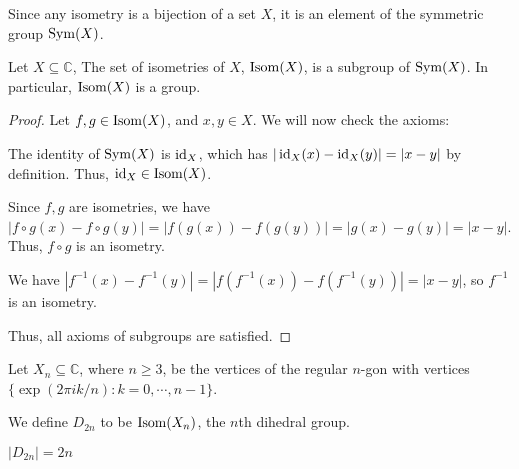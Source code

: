 \documentclass[12pt]{article}
\begin{document}
Since any isometry is a bijection of a set $X$,
it is an element of the symmetric group $\operatorname{Sym}(X)$.

\begin{prop}
    Let $X \subseteq \mathbb{C}$, The set of isometries of $X$,
    $\operatorname{Isom}(X)$, is a subgroup of $\operatorname{Sym}(X)$.
    In particular, $\operatorname{Isom}(X)$ is a group.
\end{prop}
\begin{proof}
    Let $f,g \in \operatorname{Isom}(X)$, and $x,y \in X$. 
    We will now check the axioms:
    \begin{compactenum}
    \item The identity of $\operatorname{Sym}(X)$ is $\operatorname{id}_{X}$, 
        which has $|\operatorname{id}_{X}(x) - \operatorname{id}_{X}(y)| = |x - y|$ by definition.
        Thus, $\operatorname{id}_{X} \in \operatorname{Isom}(X)$.
    \item Since $f,g$ are isometries, we have
        $|f \circ g(x) - f\circ g(y)| = |f(g(x)) - f(g(y))| = |g(x) - g(y)| = |x - y|$.
        Thus, $f\circ g$ is an isometry.
    \item We have
        $|f^{-1}(x) - f^{-1}(y)| = |f(f^{-1}(x)) - f(f^{-1}(y))| = |x - y|$,
        so $f^{-1}$ is an isometry.
    \end{compactenum}
    Thus, all axioms of subgroups are satisfied.
\end{proof}

\begin{definition}
    Let $X_n\subseteq \mathbb{C}$, where $n \ge 3$, be the vertices of the
    regular $n$-gon with vertices $\{\exp(2\pi i k / n) : k = 0,\cdots,n-1\}$.
    \begin{center}
    \end{center}
    We define $D_{2n}$ to be $\operatorname{Isom}(X_n)$, the $n$th dihedral group.
\end{definition}

\begin{theorem}
    \label{thm:size_of_d2n}
    $|D_{2n}| = 2n$
\end{theorem}
\end{document}
